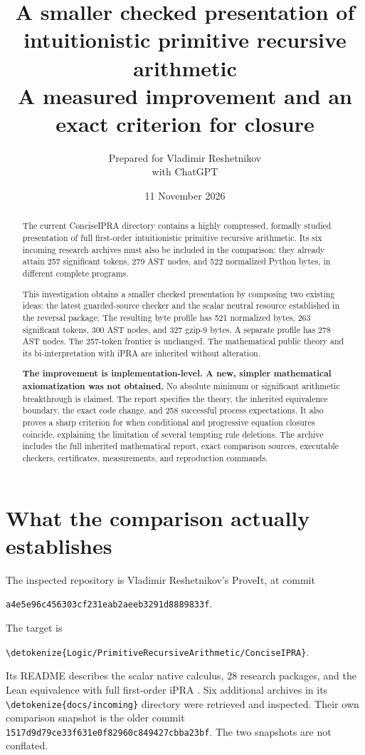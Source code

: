 \documentclass[11pt,letterpaper]{article}
\title{\color{ink}\bfseries A smaller checked presentation of\\intuitionistic primitive recursive arithmetic\\[7pt]
\large A measured improvement and an exact criterion for closure}
\author{Prepared for Vladimir Reshetnikov\\with ChatGPT}
\date{11 November 2026}
\theoremstyle{definition}
\theoremstyle{remark}
\newcommand{\file}[1]{\expandafter\nolinkurl\expandafter{\detokenize{#1}}}
\begin{document}
\maketitle
\begin{abstract}
The current ConciseIPRA directory contains a highly compressed, formally
studied presentation of full first-order intuitionistic primitive recursive
arithmetic. Its six incoming research archives must also be included in the
comparison: they already attain 257 significant tokens, 279 AST nodes, and
522 normalized Python bytes, in different complete programs.

This investigation obtains a smaller checked presentation by composing two
existing ideas: the latest guarded-source checker and the scalar neutral
resource established in the reversal package. The resulting byte profile
has 521 normalized bytes, 263 significant tokens, 300 AST nodes, and 327
gzip-9 bytes. A separate profile has 278 AST nodes. The 257-token frontier
is unchanged. The mathematical public theory and its bi-interpretation
with iPRA are inherited without alteration.

\textbf{The improvement is implementation-level. A new, simpler
mathematical axiomatization was not obtained.} No absolute minimum or
significant arithmetic breakthrough is claimed. The report specifies the
theory, the inherited equivalence boundary, the exact code change, and 258
successful process expectations. It also proves a sharp criterion for when
conditional and progressive equation closures coincide, explaining the
limitation of several tempting rule deletions. The archive includes the
full inherited mathematical report, exact comparison sources, executable
checkers, certificates, measurements, and reproduction commands.
\end{abstract}
\clearpage
\setcounter{tocdepth}{1}
\tableofcontents
\clearpage

\section{What the comparison actually establishes}

The inspected repository is Vladimir Reshetnikov's ProveIt, at commit
\begin{center}\small\texttt{a4e5e96c456303cf231eab2aeeb3291d8889833f}.
\end{center}
The target is
\begin{center}\small\file{Logic/PrimitiveRecursiveArithmetic/ConciseIPRA}.
\end{center}
Its README describes the scalar native calculus, 28 research packages,
and the Lean equivalence with full first-order iPRA \cite{current}.
Six additional archives in its \file{docs/incoming} directory were
retrieved and inspected. Their own comparison snapshot is the older commit
\texttt{1517d9d79ce33f631e0f82960c849427cbba23bf}.
The two snapshots are not conflated.
\end{document}
